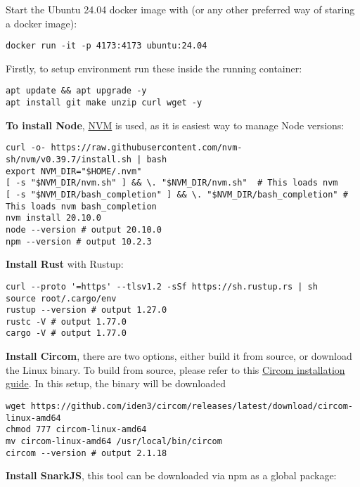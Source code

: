 Start the Ubuntu 24.04 docker image with (or any other preferred way of staring a docker image):
\begin{verbatim}
docker run -it -p 4173:4173 ubuntu:24.04 
\end{verbatim}

Firstly, to setup environment run these inside the running container:

\begin{verbatim}
apt update && apt upgrade -y
apt install git make unzip curl wget -y
\end{verbatim}

\textbf{To install Node}, \href{https://github.com/nvm-sh/nvm}{NVM} is used, as it is
easiest way to manage Node versions:
\begin{verbatim}
curl -o- https://raw.githubusercontent.com/nvm-sh/nvm/v0.39.7/install.sh | bash
export NVM_DIR="$HOME/.nvm"
[ -s "$NVM_DIR/nvm.sh" ] && \. "$NVM_DIR/nvm.sh"  # This loads nvm
[ -s "$NVM_DIR/bash_completion" ] && \. "$NVM_DIR/bash_completion" # This loads nvm bash_completion
nvm install 20.10.0
node --version # output 20.10.0
npm --version # output 10.2.3
\end{verbatim}

\textbf{Install Rust} with Rustup:

\begin{verbatim}
curl --proto '=https' --tlsv1.2 -sSf https://sh.rustup.rs | sh
source root/.cargo/env
rustup --version # output 1.27.0
rustc -V # output 1.77.0
cargo -V # output 1.77.0
\end{verbatim}

\textbf{Install Circom}, there are two options, either build it from source, or download the Linux binary.
To build from source, please refer to this \href{https://docs.circom.io/getting-started/installation/}{Circom installation guide}.
In this setup, the binary will be downloaded

\begin{verbatim}
wget https://github.com/iden3/circom/releases/latest/download/circom-linux-amd64
chmod 777 circom-linux-amd64
mv circom-linux-amd64 /usr/local/bin/circom
circom --version # output 2.1.18
\end{verbatim}

\textbf{Install SnarkJS}, this tool can be downloaded via npm as a global package:

